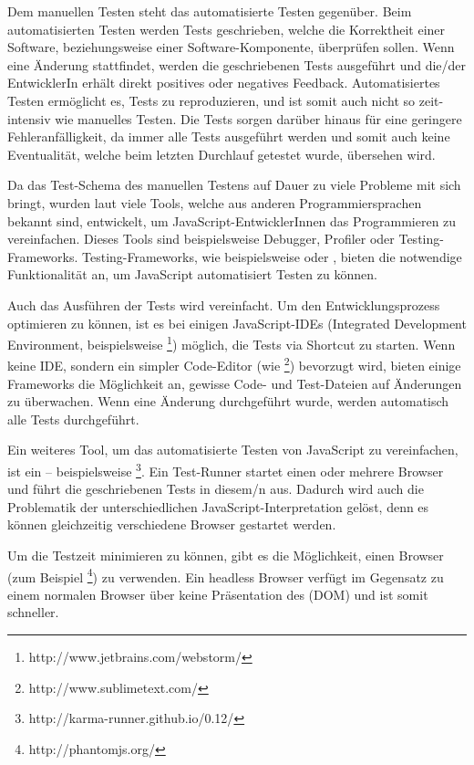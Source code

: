 Dem manuellen Testen steht das automatisierte Testen gegenüber. Beim automatisierten Testen werden Tests geschrieben, welche die Korrektheit einer Software, beziehungsweise einer Software-Komponente, überprüfen sollen. Wenn eine Änderung stattfindet, werden die geschriebenen Tests ausgeführt und die/der EntwicklerIn erhält direkt positives oder negatives Feedback. Automatisiertes Testen ermöglicht es, Tests zu reproduzieren, und ist somit auch nicht so zeit-intensiv wie manuelles Testen. Die Tests sorgen darüber hinaus für eine geringere Fehleranfälligkeit, da immer alle Tests ausgeführt werden und somit auch keine Eventualität, welche beim letzten Durchlauf getestet wurde, übersehen wird.

Da das Test-Schema des manuellen Testens auf Dauer zu viele Probleme mit sich bringt, wurden laut \cite[xix]{Johansen:2011} viele Tools, welche aus anderen Programmiersprachen bekannt sind, entwickelt, um JavaScript-EntwicklerInnen das Programmieren zu vereinfachen. Dieses Tools sind beispielsweise Debugger, Profiler oder Testing-Frameworks. Testing-Frameworks, wie beispielsweise  oder , bieten die notwendige Funktionalität an, um JavaScript automatisiert Testen zu können.

Auch das Ausführen der Tests wird vereinfacht. Um den Entwicklungsprozess optimieren zu können, ist es bei einigen JavaScript-IDEs (Integrated Development Environment, beispielsweise \footnote{http://www.jetbrains.com/webstorm/}) möglich, die Tests via Shortcut zu starten. Wenn keine IDE, sondern ein simpler Code-Editor (wie \footnote{http://www.sublimetext.com/}) bevorzugt wird, bieten einige Frameworks die Möglichkeit an, gewisse Code- und Test-Dateien auf Änderungen zu überwachen. Wenn eine Änderung durchgeführt wurde, werden automatisch alle Tests durchgeführt.

Ein weiteres Tool, um das automatisierte Testen von JavaScript zu vereinfachen, ist ein  -- beispielsweise \footnote{http://karma-runner.github.io/0.12/}. Ein Test-Runner startet einen oder mehrere Browser und führt die geschriebenen Tests in diesem/n aus. Dadurch wird auch die Problematik der unterschiedlichen JavaScript-Interpretation gelöst, denn es können gleichzeitig verschiedene Browser gestartet werden.

Um die Testzeit minimieren zu können, gibt es die Möglichkeit, einen  Browser (zum Beispiel \footnote{http://phantomjs.org/}) zu verwenden. Ein headless Browser verfügt im Gegensatz zu einem normalen Browser über keine Präsentation des  (DOM) und ist somit schneller.

